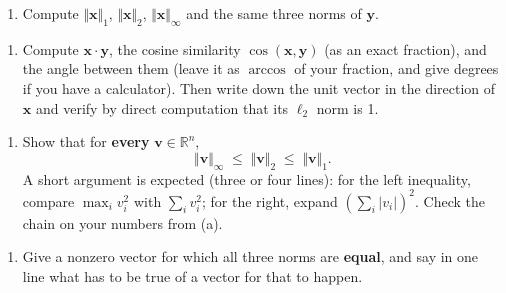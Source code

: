 \documentclass[
  11pt,
]{article}
\providecommand{\tightlist}{%
  \setlength{\itemsep}{0pt}\setlength{\parskip}{0pt}}
\begin{document}
\begin{enumerate}
\def\labelenumi{(\alph{enumi})}
\tightlist
\item
  Compute \(\Vert\mathbf{x}\Vert_1\), \(\Vert\mathbf{x}\Vert_2\),
  \(\Vert\mathbf{x}\Vert_\infty\) and the same three norms of
  \(\mathbf{y}\).
\end{enumerate}

\begin{enumerate}
\def\labelenumi{(\alph{enumi})}
\setcounter{enumi}{1}
\tightlist
\item
  Compute \(\mathbf{x}\cdot\mathbf{y}\), the cosine similarity
  \(\cos(\mathbf{x},\mathbf{y})\) (as an exact fraction), and the angle
  between them (leave it as \(\arccos\) of your fraction, and give
  degrees if you have a calculator). Then write down the unit vector in
  the direction of \(\mathbf{x}\) and verify by direct computation that
  its \(\ell_2\) norm is 1.
\end{enumerate}

\begin{enumerate}
\def\labelenumi{(\alph{enumi})}
\setcounter{enumi}{2}
\tightlist
\item
  Show that for \textbf{every} \(\mathbf{v}\in\mathbb{R}^n\),
  \[\Vert\mathbf{v}\Vert_\infty \;\le\; \Vert\mathbf{v}\Vert_2 \;\le\; \Vert\mathbf{v}\Vert_1 .\]
  A short argument is expected (three or four lines): for the left
  inequality, compare \(\max_i v_i^2\) with \(\sum_i v_i^2\); for the
  right, expand \((\sum_i |v_i|)^2\). Check the chain on your numbers
  from (a).
\end{enumerate}

\begin{enumerate}
\def\labelenumi{(\alph{enumi})}
\setcounter{enumi}{3}
\tightlist
\item
  Give a nonzero vector for which all three norms are \textbf{equal},
  and say in one line what has to be true of a vector for that to
  happen.
\end{enumerate}
\end{document}
